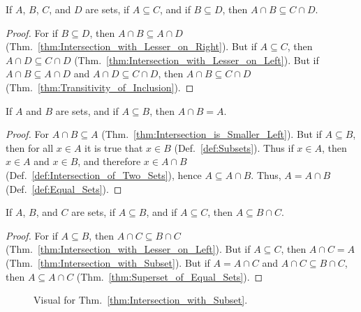         \begin{theorem}
            \label{thm:A_cap_B_Subset_C_cap_D}%
            If $A$, $B$, $C$, and $D$ are sets, if $A\subseteq{C}$, and if
            $B\subseteq{D}$, then $A\cap{B}\subseteq{C}\cap{D}$.
        \end{theorem}
        \begin{proof}
            For if $B\subseteq{D}$, then $A\cap{B}\subseteq{A}\cap{D}$
            (Thm.~\ref{thm:Intersection_with_Lesser_on_Right}). But if
            $A\subseteq{C}$, then $A\cap{D}\subseteq{C}\cap{D}$
            (Thm.~\ref{thm:Intersection_with_Lesser_on_Left}). But if
            $A\cap{B}\subseteq{A}\cap{D}$ and $A\cap{D}\subseteq{C}\cap{D}$,
            then $A\cap{B}\subseteq{C}\cap{D}$
            (Thm.~\ref{thm:Transitivity_of_Inclusion}).
        \end{proof}
        \begin{theorem}
            \label{thm:Intersection_with_Subset}%
            If $A$ and $B$ are sets, and if $A\subseteq{B}$, then $A\cap{B}=A$.
        \end{theorem}
        \begin{proof}
            For $A\cap{B}\subseteq{A}$
            (Thm.~\ref{thm:Intersection_is_Smaller_Left}). But if
            $A\subseteq{B}$, then for all $x\in{A}$ it is true that $x\in{B}$
            (Def.~\ref{def:Subsets}). Thus if $x\in{A}$, then $x\in{A}$ and
            $x\in{B}$, and therefore $x\in{A}\cap{B}$
            (Def.~\ref{def:Intersection_of_Two_Sets}), hence
            $A\subseteq{A}\cap{B}$. Thus, $A=A\cap{B}$
            (Def.~\ref{def:Equal_Sets}).
        \end{proof}
        \begin{theorem}
            \label{thm:Intersection_of_Supersets_is_Still_Superset}%
            If $A$, $B$, and $C$ are sets, if $A\subseteq{B}$, and if
            $A\subseteq{C}$, then $A\subseteq{B}\cap{C}$.
        \end{theorem}
        \begin{proof}
            For if $A\subseteq{B}$, then $A\cap{C}\subseteq{B}\cap{C}$
            (Thm.~\ref{thm:Intersection_with_Lesser_on_Left}). But if
            $A\subseteq{C}$, then $A\cap{C}=A$
            (Thm.~\ref{thm:Intersection_with_Subset}). But if $A=A\cap{C}$
            and $A\cap{C}\subseteq{B}\cap{C}$, then $A\subseteq{A}\cap{C}$
            (Thm.~\ref{thm:Superset_of_Equal_Sets}).
        \end{proof}
        \begin{figure}[H]
            \centering
            \captionsetup{type=figure}
            \centering
            
            \caption{Visual for Thm.~\ref{thm:Intersection_with_Subset}.}
            \label{fig:Union_Intersection_venn_diagram}
        \end{figure}
